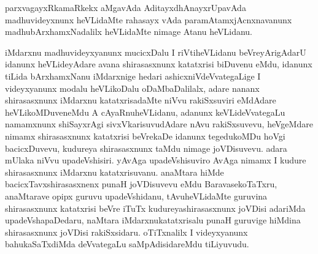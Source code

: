 \begin{artha}
parxvagayxRkamaRkekx aMgavAda AditayxdhAnayxrUpavAda madhuvideyxnunx heVLidaMte rahasayx vAda paramAtamxjAcnxnavanunx madhubArxhamxNadalilx heVLidaMte nimage Atanu heVLidanu.
\end{artha}

\begin{center}
\end{center}

\begin{artha}
iMdarxnu madhuvideyxyanunx mucicxDalu I riVtiheVLidanu beVreyArigAdarU idanunx heVLideyAdare avana shirasasxnunx katatxrisi biDuvenu eMdu, idanunx tiLida bArxhamxNanu iMdarxnige hedari ashicxniVdeVvategaLige I videyxyanunx modalu heVLikoDalu oDaMbaDalilalx, adare nananx shirasasxnunx iMdarxnu katatxrisadaMte niVvu rakiSxsuviri eMdAdare heVLikoMDuveneMdu A cAyaRnuheVLidanu, adanunx keVLideVvategaLu namamxnunx shiSayxrAgi sivxVkarisuvudAdare nAvu rakiSxsuvevu, heVgeMdare nimamx shirasasxnunx katatxrisi beVrekaDe idanunx tegedukoMDu hoVgi bacicxDuvevu, kudureya shirasasxnunx taMdu nimage joVDisuvevu. adara mUlaka niVvu upadeVshisiri. yAvAga upadeVshisuviro AvAga nimamx I kudure shirasasxnunx iMdarxnu katatxrisuvanu. anaMtara hiMde bacicxTavxshirasasxnenx punaH joVDisuvevu eMdu BaravasekoTaTxru, anaMtarave opipx guruvu upadeVshidanu, tAvuheVLidaMte guruvina shirasasxnunx katatxrisi beVre iTuTx kudureyashirasasxnunx joVDisi adariMda upadeVshapaDedaru, naMtara iMdarxnukatatxrisalu punaH guruvige  hiMdina shirasasxnunx joVDisi rakiSxsidaru. oTiTxnalilx I videyxyanunx bahukaSaTxdiMda deVvategaLu saMpAdisidareMdu tiLiyuvudu.
\end{artha}

